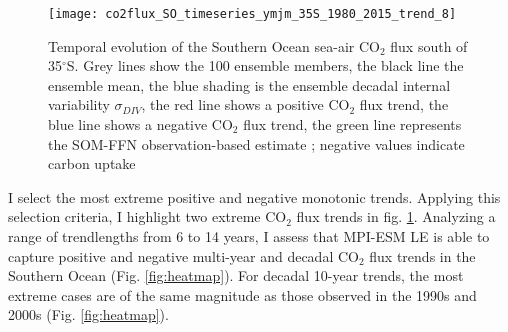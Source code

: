 \begin{figure}%
	\texttt{[image: co2flux\_SO\_timeseries\_ymjm\_35S\_1980\_2015\_trend\_8]}
	\caption{Temporal evolution of the Southern Ocean sea-air CO$_2$ flux south of 35$^\circ$S. Grey lines show the 100 ensemble members, the black line the ensemble mean, the blue shading is the ensemble decadal internal variability $\sigma_{DIV}$, the red line shows a positive CO$_2$ flux trend, the blue line shows a negative CO$_2$ flux trend, the green line represents the \acs{SOM-FFN} observation-based estimate \citep{landschuetzer2015}; negative values indicate carbon uptake}
	\label{fig:evolution_southern_ocean_carbon_sink}
\end{figure}



I select the most extreme positive and negative monotonic trends. 
Applying this selection criteria, I highlight two extreme CO$_2$ flux trends in fig. \ref{fig:evolution_southern_ocean_carbon_sink}. Analyzing a range of trendlengths from 6 to 14 years, I assess that \acs{MPI-ESM LE} is able to capture positive and negative multi-year and decadal CO$_2$ flux trends in the Southern Ocean (Fig. \ref{fig:heatmap}). For decadal 10-year trends, the most extreme cases are of the same magnitude as those observed in the 1990s and 2000s  \citep{LeQuere2007,landschuetzer2015} (Fig. \ref{fig:heatmap}). 

